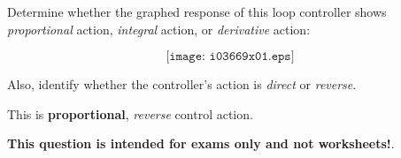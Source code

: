 

Determine whether the graphed response of this loop controller shows {\it proportional} action, {\it integral} action, or {\it derivative} action:

$$\texttt{[image: i03669x01.eps]}$$

Also, identify whether the controller's action is {\it direct} or {\it reverse}.







This is {\bf proportional}, {\it reverse} control action.







{\bf This question is intended for exams only and not worksheets!}.


